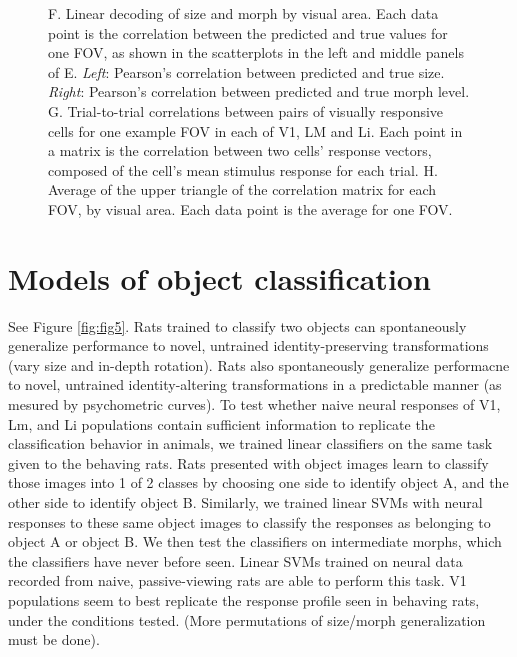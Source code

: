 \documentclass{article}
\begin{document}
\begin{figure}[ht]
  F.  Linear decoding of size and morph by visual area. Each data point is the correlation between the predicted and true values for one FOV, as shown in the scatterplots in the left and middle panels of E.  \textit{Left}:  Pearson’s correlation between predicted and true size.  \textit{Right}:  Pearson’s correlation between predicted and true morph level. 
  G.  Trial-to-trial correlations between pairs of visually responsive cells for one example FOV in each of V1, LM and Li. Each point in a matrix is the correlation between two cells’ response vectors, composed of the cell’s mean stimulus response for each trial.
  H.  Average of the upper triangle of the correlation matrix for each FOV, by visual area. Each data point is the average for one FOV. 
  \label{fig:fig4}
\end{figure}

\section{Models of object classification}
See Figure \ref{fig:fig5}. Rats trained to classify two objects can spontaneously generalize performance to novel, untrained identity-preserving transformations (vary size and in-depth rotation). Rats also spontaneously generalize performacne to novel, untrained identity-altering transformations in a predictable manner (as mesured by psychometric curves). To test whether naive neural responses of V1, Lm, and Li populations contain sufficient information to replicate the classification behavior in animals, we trained linear classifiers on the same task given to the behaving rats. Rats presented with object images learn to classify those images into 1 of 2 classes by  choosing one side to identify object A, and the other side to identify object B. Similarly, we trained linear SVMs with neural responses to these same object images to classify the responses as belonging to object A or object B. We then test the classifiers on intermediate morphs, which the classifiers have never before seen. Linear SVMs trained on neural data recorded from naive, passive-viewing rats are able to perform this task. V1 populations seem to best replicate the response profile seen in behaving rats, under the conditions tested. (More permutations of size/morph generalization must be done). 
\end{document}
